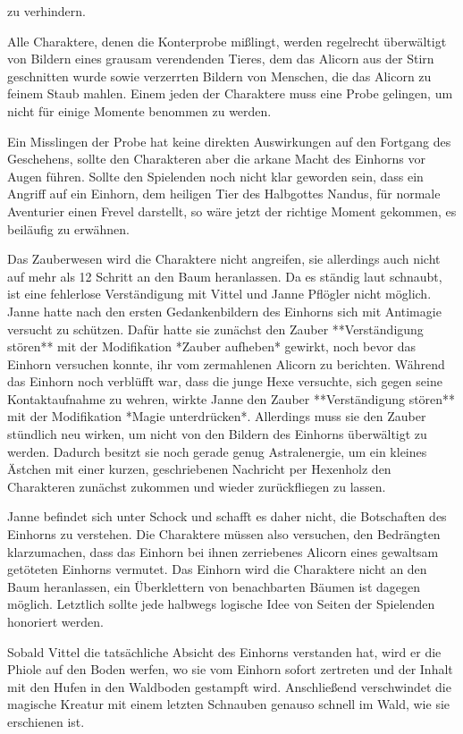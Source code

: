 zu verhindern. 

Alle Charaktere, denen die Konterprobe mißlingt, werden  regelrecht überwältigt von Bildern eines grausam verendenden Tieres, dem das Alicorn aus der Stirn geschnitten wurde sowie verzerrten Bildern von Menschen, die das Alicorn zu feinem Staub mahlen. Einem jeden der Charaktere muss eine Probe 
\platz
{}
gelingen, um nicht für einige Momente benommen zu werden. 


Ein Misslingen der Probe hat keine direkten Auswirkungen auf den Fortgang des Geschehens, sollte den Charakteren aber die arkane Macht des Einhorns vor Augen führen. Sollte den Spielenden noch nicht klar geworden sein, dass ein Angriff auf ein Einhorn, dem heiligen Tier des Halbgottes Nandus, für normale Aventurier einen Frevel darstellt, so wäre jetzt der richtige Moment gekommen, es beiläufig zu erwähnen.


Das Zauberwesen wird die Charaktere nicht angreifen, sie allerdings auch nicht auf mehr als 12 Schritt an den Baum heranlassen. Da es ständig laut schnaubt, ist eine fehlerlose Verständigung mit Vittel und Janne Pflögler nicht möglich. Janne hatte nach den ersten Gedankenbildern des Einhorns sich mit Antimagie versucht zu schützen. Dafür hatte sie zunächst den Zauber **Verständigung stören** mit der Modifikation *Zauber aufheben* gewirkt, noch bevor das Einhorn versuchen konnte, ihr vom zermahlenen Alicorn zu berichten. Während das Einhorn noch verblüfft war, dass die junge Hexe versuchte, sich gegen seine Kontaktaufnahme zu wehren, wirkte Janne den Zauber **Verständigung stören** mit der Modifikation *Magie unterdrücken*. Allerdings muss sie den Zauber stündlich neu wirken, um nicht von den Bildern des Einhorns überwältigt zu werden. Dadurch besitzt sie noch gerade genug Astralenergie, um ein kleines Ästchen mit einer kurzen, geschriebenen Nachricht per Hexenholz den Charakteren zunächst zukommen und wieder zurückfliegen zu lassen. 


Janne befindet sich unter Schock und schafft es daher nicht, die Botschaften des Einhorns zu verstehen. Die Charaktere müssen also versuchen, den Bedrängten klarzumachen, dass das Einhorn bei ihnen zerriebenes Alicorn eines gewaltsam getöteten Einhorns vermutet. Das Einhorn wird die Charaktere nicht an den Baum heranlassen, ein Überklettern von benachbarten Bäumen ist dagegen möglich. Letztlich sollte jede halbwegs logische Idee von Seiten der Spielenden honoriert werden.


Sobald Vittel die tatsächliche Absicht des Einhorns verstanden hat, wird er die Phiole auf den Boden werfen, wo sie vom Einhorn sofort zertreten und der Inhalt mit den Hufen in den Waldboden gestampft wird. Anschließend verschwindet die magische Kreatur mit einem letzten Schnauben genauso schnell im Wald, wie sie erschienen ist.


